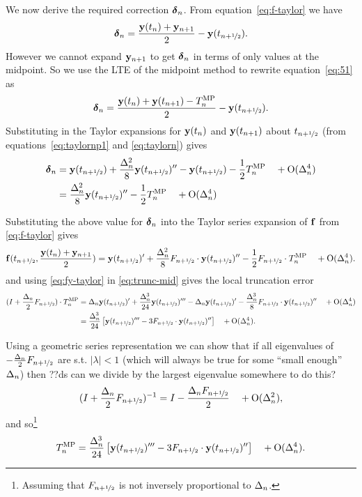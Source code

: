 We now derive the required correction $\mbox{\boldmath$\delta$}_{n}$.
From equation~\eqref{eq:f-taylor} we have
\begin{equation}
  \mbox{\boldmath$\delta$}_{n} = \frac{\mathbf{y}(t_n) + \mathbf{y}_{n+1}}{2} - \mathbf{y}(t_{n+\nicefrac{1}{2}}).
  \label{eq:51}
\end{equation}
However we cannot expand $\mathbf{y}_{n+1}$ to get $\mbox{\boldmath$\delta$}_{n}$ in terms of only values at the midpoint.
So we use the LTE of the midpoint method to rewrite equation~\eqref{eq:51} as
\begin{equation}
  \mbox{\boldmath$\delta$}_{n} = \frac{\mathbf{y}(t_n) + \mathbf{y}(t_{n+1}) - T_n^{\text{MP}}}{2} - \mathbf{y}(t_{n+\nicefrac{1}{2}}).
\end{equation}
Substituting in the Taylor expansions for $\mathbf{y}(t_n)$ and $\mathbf{y}(t_{n+1})$ about $t_{n+\nicefrac{1}{2}}$ (from equations~\eqref{eq:taylornp1} and \eqref{eq:taylorn}) gives
\begin{align}
  \mbox{\boldmath$\delta$}_{n} &= \mathbf{y}(t_{n+\nicefrac{1}{2}}) + \frac{\Delta_{n}^2}{8} \mathbf{y}(t_{n+\nicefrac{1}{2}})'' - \mathbf{y}(t_{n+\nicefrac{1}{2}}) - \frac{1}{2} T_n^{\text{MP}} \quad + \text{O}(\Delta_{n}^4) \notag\\
  &= \frac{\Delta_{n}^2}{8} \mathbf{y}(t_{n+\nicefrac{1}{2}})'' - \frac{1}{2} T_n^{\text{MP}} \quad + \text{O}(\Delta_{n}^4)
  \label{eq:dy-value}
\end{align}



Substituting the above value for $\mbox{\boldmath$\delta$}_{n}$ into the Taylor series expansion of ${\mathbf{f}}$ from \eqref{eq:f-taylor} gives
\begin{equation}
  {\mathbf{f}}(t_{n+\nicefrac{1}{2}}, \frac{\mathbf{y}(t_n) + \mathbf{y}_{n+1}}{2}) = \mathbf{y}(t_{n+\nicefrac{1}{2}})'
  + \frac{\Delta_{n}^2}{8} F_{n+\nicefrac{1}{2}} \cdot \mathbf{y}(t_{n+\nicefrac{1}{2}})'' - \frac{1}{2} F_{n+\nicefrac{1}{2}} \cdot T_n^{\text{MP}} \quad + \text{O}(\Delta_{n}^4)
  . \label{eq:fy-taylor}
\end{equation}
and using \eqref{eq:fy-taylor} in \eqref{eq:trunc-mid} gives the local truncation error
\begin{align}
  (I + \frac{\Delta_{n}}{2}F_{n+\nicefrac{1}{2}}) \cdot T_n^{\text{MP}}
  &= \Delta_{n} \mathbf{y}(t_{n+\nicefrac{1}{2}})' + \frac{\Delta_{n}^3}{24} \mathbf{y}(t_{n+\nicefrac{1}{2}})'''
  - \Delta_{n} \mathbf{y}(t_{n+\nicefrac{1}{2}})'
  - \frac{\Delta_{n}^3}{8} F_{n+\nicefrac{1}{2}} \cdot \mathbf{y}(t_{n+\nicefrac{1}{2}})'' \quad + \text{O}(\Delta_{n}^4)
  \notag \\
  &= \frac{\Delta_{n}^3}{24} \left[\mathbf{y}(t_{n+\nicefrac{1}{2}})''' - 3 F_{n+\nicefrac{1}{2}} \cdot \mathbf{y}(t_{n+\nicefrac{1}{2}})'' \right]
  \quad + \text{O}(\Delta_{n}^4).
  \label{eq:trunc-implicit-form}
\end{align}

Using a geometric series representation we can show that if all eigenvalues of  $-\frac{\Delta_{n}}{2}F_{n+\nicefrac{1}{2}}$ are s.t. $|\lambda| < 1$\cite{??ds} (which will always be true for some ``small enough'' $\Delta_{n}$) then
??ds can we divide by the largest eigenvalue somewhere to do this?
\begin{equation}
  (I + \frac{\Delta_{n}}{2}F_{n+\nicefrac{1}{2}})^{-1} = I - \frac{\Delta_{n} F_{n+\nicefrac{1}{2}}}{2}  \quad + \text{O}(\Delta_{n}^2),
\end{equation}
and so\footnote{Assuming that $F_{n+\nicefrac{1}{2}}$ is not inversely proportional to $\Delta_{n}$.}
\begin{equation}
  T_n^{\text{MP}} = \frac{\Delta_{n}^3}{24} \left[\mathbf{y}(t_{n+\nicefrac{1}{2}})''' - 3 F_{n+\nicefrac{1}{2}} \cdot \mathbf{y}(t_{n+\nicefrac{1}{2}})'' \right]
  \quad +\text{O}(\Delta_{n}^4).
  \label{eq:trunc-final}
\end{equation}


